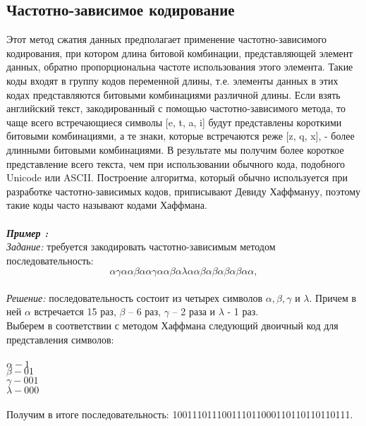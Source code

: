 \subsection{Частотно-зависимое кодирование}
Этот метод сжатия данных предполагает применение частотно-зависимого кодирования, при котором длина битовой комбинации, представляющей элемент данных, обратно пропорциональна частоте использования этого элемента. Такие коды входят в группу кодов переменной длины, т.е. элементы данных в этих кодах представляются битовыми комбинациями различной длины. Если взять английский текст, закодированный с помощью частотно-зависимого метода, то чаще всего встречающиеся символы [e, t, a, i] будут представлены короткими битовыми комбинациями, а те знаки, которые встречаются реже [z, q, x], - более длинными битовыми комбинациями. В результате мы получим более короткое представление всего текста, чем при использовании обычного кода, подобного Unicode или ASCII. Построение алгоритма, который обычно используется при разработке частотно-зависимых кодов, приписывают Девиду Хаффмануу, поэтому такие коды часто называют кодами Хаффмана.\\
\\\emph{\textbf{Пример :}}
\\\emph{Задание:} требуется закодировать частотно-зависимым методом последовательность:\\ $$\alpha\gamma\alpha\alpha\beta\alpha\alpha\gamma\alpha\alpha\beta\alpha\lambda\alpha\alpha\beta\alpha\beta\alpha\beta\alpha\beta\alpha\alpha,$$
\\\emph{Решение:} последовательность состоит из четырех символов $\alpha, \beta, \gamma$ и $\lambda$. Причем в ней $\alpha$ встречается 15 раз, $\beta$ -- 6 раз, $\gamma$ -- 2 раза и $\lambda$ - 1 раз.\\
Выберем в соответствии с методом Хаффмана следующий двоичный код для представления символов:\\
\\$\alpha - 1$
\\$\beta - 01$
\\$\gamma - 001$
\\$\lambda - 000$\\
\\Получим в итоге последовательность: 100111011100111011000110110110110111.

